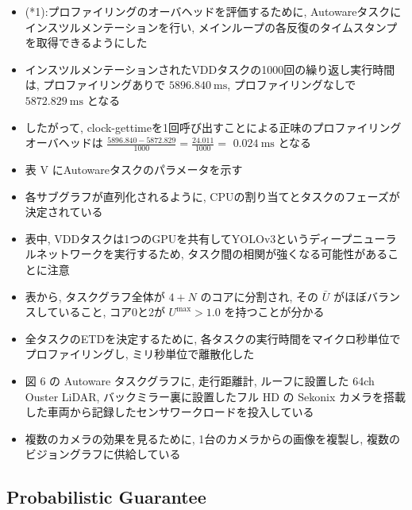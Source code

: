\begin{frame}{}
    \begin{itemize}
        \item (*1):プロファイリングのオーバヘッドを評価するために, Autowareタスクにインスツルメンテーションを行い, メインループの各反復のタイムスタンプを取得できるようにした
\item インスツルメンテーションされたVDDタスクの1000回の繰り返し実行時間は, プロファイリングありで $5896.840 \mathrm{~ms}$, プロファイリングなしで $5872.829 \mathrm{~ms}$ となる
\item したがって, clock-gettimeを1回呼び出すことによる正味のプロファイリングオーバヘッドは $\frac{5896.840-5872.829}{1000}=\frac{24.011}{1000}=$  $0.024 \mathrm{~ms}$ となる
    \end{itemize}
\end{frame}

\begin{frame}{}
    \begin{itemize}
        \item 表 $\mathrm{V}$ にAutowareタスクのパラメータを示す
\item 各サブグラフが直列化されるように, CPUの割り当てとタスクのフェーズが決定されている
\item 表中, VDDタスクは1つのGPUを共有してYOLOv3というディープニューラルネットワークを実行するため, タスク間の相関が強くなる可能性があることに注意
\item 表から, タスクグラフ全体が $4+N$ のコアに分割され, その $\bar{U}$ がほぼバランスしていること, コア0と2が $U^{\max }>1.0$ を持つことが分かる
\item 全タスクのETDを決定するために, 各タスクの実行時間をマイクロ秒単位でプロファイリングし, ミリ秒単位で離散化した
    \end{itemize}
\end{frame}

\begin{frame}{}
    \begin{itemize}
        \item 図 6 の Autoware タスクグラフに, 走行距離計, ルーフに設置した 64ch Ouster LiDAR, バックミラー裏に設置したフル HD の Sekonix カメラを搭載した車両から記録したセンサワークロードを投入している
\item 複数のカメラの効果を見るために, 1台のカメラからの画像を複製し, 複数のビジョングラフに供給している
    \end{itemize}
\end{frame}


\subsection{Probabilistic Guarantee}
\label{ssec: probabilistic guarantee}

